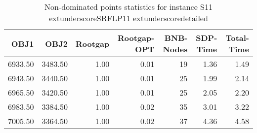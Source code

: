 \begin{table}
\caption{Non-dominated points statistics for instance S11	extunderscoreSRFLP11	extunderscoredetailed}
\label{tab:stats/S11_SRFLP11_detailed}
\begin{tabular}{rrrrrrr}
\toprule
OBJ1 & OBJ2 & Rootgap & Rootgap-OPT & BNB-Nodes & SDP-Time & Total-Time \\
\midrule
6933.50 & 3483.50 & 1.00 & 0.01 & 19 & 1.36 & 1.49 \\
6943.50 & 3440.50 & 1.00 & 0.01 & 25 & 1.99 & 2.14 \\
6965.50 & 3420.50 & 1.00 & 0.01 & 25 & 2.05 & 2.20 \\
6983.50 & 3384.50 & 1.00 & 0.02 & 35 & 3.01 & 3.22 \\
7005.50 & 3364.50 & 1.00 & 0.02 & 37 & 4.36 & 4.58 \\
\bottomrule
\end{tabular}
\end{table}
